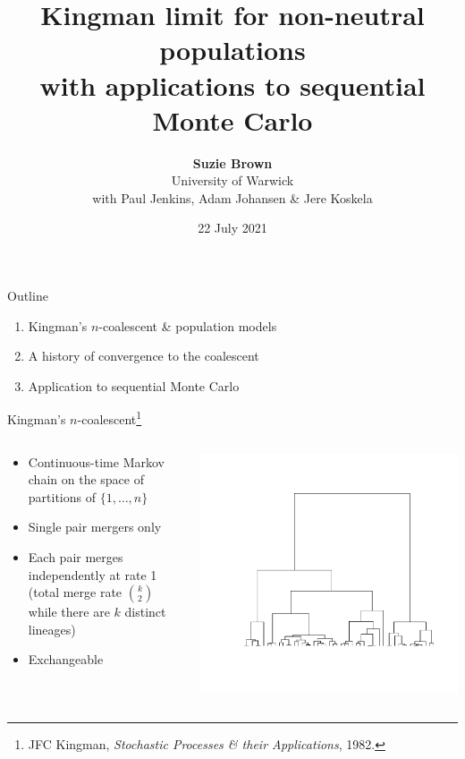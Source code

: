 \documentclass[aspectratio=169,fleqn]{beamer}
\title[Non-neutral populations]{Kingman limit for non-neutral populations\\ with applications to sequential Monte Carlo}
\author[Suzie Brown]{\textbf{Suzie Brown} \\[5pt] University of Warwick \\ with Paul Jenkins, Adam Johansen \& Jere Koskela}
\date{22 July 2021}
\theoremstyle{definition}
\begin{document}
\begin{frame}
	\maketitle
\end{frame}


\begin{frame}{Outline}
	\begin{enumerate}
	\item Kingman's $n$-coalescent \& population models
	\item A history of convergence to the coalescent
	\item Application to sequential Monte Carlo
	\end{enumerate}
\end{frame}


\begin{frame}{Kingman's $n$-coalescent\footnote[frame]{JFC Kingman, \textit{Stochastic Processes \& their Applications}, 1982.}}
	\begin{columns}
	\begin{column}{0.45\textwidth}
		\begin{itemize}
		\item Continuous-time Markov chain on the space of partitions of $\{1,\dots,n\}$
		\item Single pair mergers only
		\item Each pair merges independently at rate 1 (total merge rate $\binom{k}{2}$ while there are $k$ distinct lineages)
		\item Exchangeable
		\end{itemize}
	\end{column}
	\begin{column}{0.45\textwidth}
		\includegraphics[width=\textwidth, trim={2.8cm 3cm 1.5cm 2cm}, clip]{ncoalescent.pdf}
	\end{column}
	\end{columns}
\end{frame}
\end{document}
